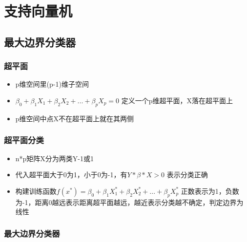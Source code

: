 \documentclass[
]{book}
\providecommand{\tightlist}{%
  \setlength{\itemsep}{0pt}\setlength{\parskip}{0pt}}
\begin{document}
\hypertarget{ux652fux6301ux5411ux91cfux673a}{%
\section{支持向量机}\label{ux652fux6301ux5411ux91cfux673a}}

\hypertarget{ux6700ux5927ux8fb9ux754cux5206ux7c7bux5668}{%
\subsection{最大边界分类器}\label{ux6700ux5927ux8fb9ux754cux5206ux7c7bux5668}}

\hypertarget{ux8d85ux5e73ux9762}{%
\subsubsection{超平面}\label{ux8d85ux5e73ux9762}}

\begin{itemize}
\tightlist
\item
  p维空间里(p-1)维子空间
\item
  \(\beta_0 + \beta_1 X_1 + \beta_2 X_2 + ... + \beta_p X_p = 0\) 定义一个p维超平面，X落在超平面上
\item
  p维空间中点X不在超平面上就在其两侧
\end{itemize}

\hypertarget{ux8d85ux5e73ux9762ux5206ux7c7b}{%
\subsubsection{超平面分类}\label{ux8d85ux5e73ux9762ux5206ux7c7b}}

\begin{itemize}
\tightlist
\item
  n*p矩阵X分为两类Y-1或1
\item
  代入超平面大于0为1，小于0为-1，有\(Y*\beta*X > 0\) 表示分类正确
\item
  构建训练函数\(f(x^*) = \beta_0 + \beta_1 X_1^* + \beta_2 X_2^* + ... + \beta_p X_p^*\) 正数表示为1，负数为-1，距离0越远表示距离超平面越远，越近表示分类越不确定，判定边界为线性
\end{itemize}

\hypertarget{ux6700ux5927ux8fb9ux754cux5206ux7c7bux5668-1}{%
\subsubsection{最大边界分类器}\label{ux6700ux5927ux8fb9ux754cux5206ux7c7bux5668-1}}
\end{document}
